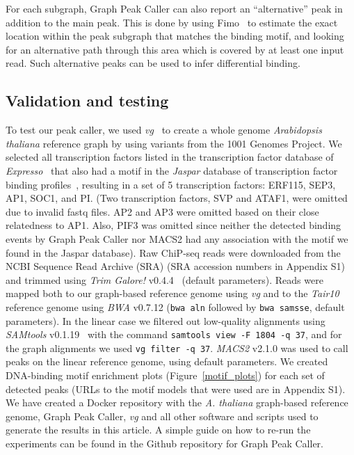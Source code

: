 \documentclass[10pt,letterpaper]{article}
\begin{document}
For each subgraph, Graph Peak Caller can also report an “alternative” peak in addition to the main peak.
This is done by using Fimo~\cite{fimo} to estimate the exact location within the peak subgraph that matches the binding motif, and looking for an alternative path through this area which is covered by at least one input read.
Such alternative peaks can be used to infer differential binding.

\subsection*{Validation and testing}
To test our peak caller, we used \emph{vg}~\cite{vg} to create a whole genome \emph{Arabidopsis thaliana} reference graph by using variants from the 1001 Genomes Project.
We selected all transcription factors listed in the transcription factor database of \emph{Expresso}~\cite{expresso} that also had a motif in the \emph{Jaspar} database of transcription factor binding profiles~\cite{jaspar}, resulting in a set of 5 transcription factors: ERF115, SEP3, AP1, SOC1, and PI.
(Two transcription factors, SVP and ATAF1, were omitted due to invalid fastq files. AP2 and AP3 were omitted based on their close relatedness to AP1. Also, PIF3 was omitted since neither the detected binding events by Graph Peak Caller nor MACS2 had any association with the motif we found in the Jaspar database).
Raw ChiP-seq reads were downloaded from the NCBI Sequence Read Archive (SRA) (SRA accession numbers in Appendix S1) and trimmed using \emph{Trim Galore!} v0.4.4~\cite{trim_galore} (default parameters).
Reads were mapped both to our graph-based reference genome using \emph{vg} and to the \emph{Tair10}~\cite{tair} reference genome using \emph{BWA} v0.7.12 (\texttt{bwa aln} followed by \texttt{bwa samsse}, default parameters).
In the linear case we filtered out low-quality alignments using \emph{SAMtools} v0.1.19~\cite{samtools} with the command \texttt{samtools view -F 1804 -q 37}, and for the graph alignments we used \texttt{vg filter -q 37}.
\emph{MACS2} v2.1.0 was used to call peaks on the linear reference genome, using default parameters. We created DNA-binding motif enrichment plots (Figure~\ref{motif_plots}) for each set of detected peaks (URLs to the motif models that were used are in Appendix S1). We have created a Docker repository with the \emph{A. thaliana} graph-based reference genome, Graph Peak Caller, \emph{vg} and all other software and scripts used to generate the results in this article. A simple guide on how to re-run the experiments can be found in the Github repository for Graph Peak Caller.
\end{document}
